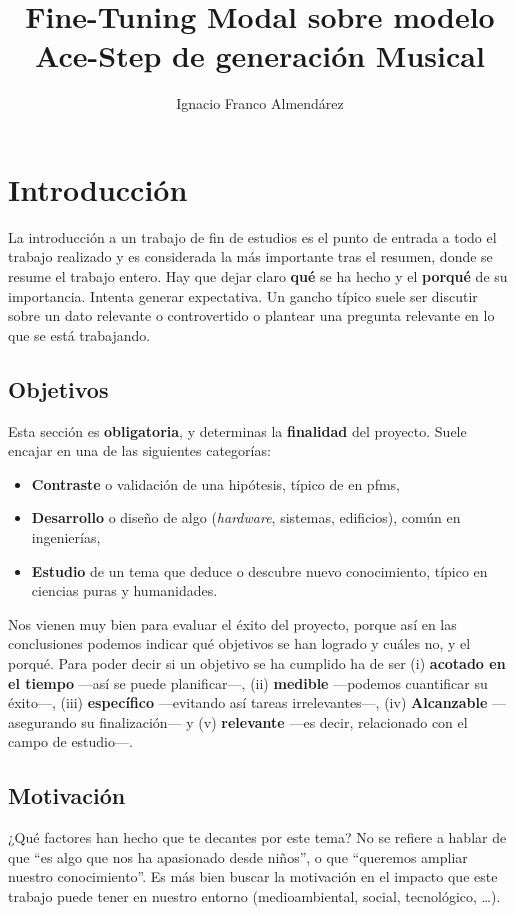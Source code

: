 \documentclass[%
    school=etsisi,%
    type=pfg,%
    degree=61CD,%
]{upm-report}
\title{Fine-Tuning Modal sobre modelo Ace-Step de generación Musical}
\author{Ignacio Franco Almendárez}
\begin{document}
\chapter{Introducción}
\label{ch:introduccion}

La introducción a un trabajo de fin de estudios es el punto de entrada a
todo el trabajo realizado y es considerada la más importante tras el
resumen, donde se resume el trabajo entero. Hay que dejar claro
\textbf{qué} se ha hecho y el \textbf{porqué} de su importancia. Intenta
generar expectativa. Un gancho típico suele ser discutir sobre un dato
relevante o controvertido o plantear una pregunta relevante en lo que se
está trabajando.

\section{Objetivos}

Esta sección es \textbf{obligatoria}, y determinas la \textbf{finalidad}
del proyecto. Suele encajar en una de las siguientes categorías:

\begin{itemize}
    \item \textbf{Contraste} o validación de una hipótesis, típico de en
        \glspl{pfm},
    \item \textbf{Desarrollo} o diseño de algo (\textit{hardware},
        sistemas, edificios), común en ingenierías,
    \item \textbf{Estudio} de un tema que deduce o descubre nuevo
        conocimiento, típico en ciencias puras y humanidades.
\end{itemize}

Nos vienen muy bien para evaluar el éxito del proyecto, porque así en
las conclusiones podemos indicar qué objetivos se han logrado y cuáles
no, y el porqué. Para poder decir si un objetivo se ha cumplido ha de
ser (i) \textbf{acotado en el tiempo} ---así se puede planificar---,
(ii) \textbf{medible} ---podemos cuantificar su éxito---, (iii)
\textbf{específico} ---evitando así tareas irrelevantes---, (iv)
\textbf{Alcanzable}  ---asegurando su finalización--- y (v)
\textbf{relevante} ---es decir, relacionado con el campo de estudio---.

\section{Motivación}
\label{s:motivacion}

¿Qué factores han hecho que te decantes por este tema? No se refiere a
hablar de que \enquote{es algo que nos ha apasionado desde niños}, o que
\enquote{queremos ampliar nuestro conocimiento}. Es más bien buscar la
motivación en el impacto que este trabajo puede tener en nuestro entorno
(medioambiental, social, tecnológico, \ldots).
\end{document}
